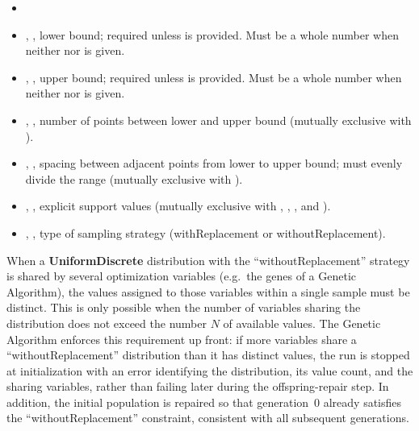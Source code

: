 %
\attrIntro
\vspace{-5mm}
\begin{itemize}
  \itemsep0em
  \item \nameDescription
\end{itemize}
\vspace{-5mm}
\subnodeIntro
\begin{itemize}
  \item {}, , lower bound; required unless
         is provided. Must be a whole number when neither  nor  is given.
  \item {}, , upper bound; required unless
         is provided. Must be a whole number when neither  nor  is given.
  \item {},    , number of points between lower and upper bound (mutually exclusive with ).
  \item {},       , spacing between adjacent points from lower to upper bound; must evenly divide the range (mutually exclusive with ).
  \item {},     , explicit support values (mutually exclusive with , , , and ).
  \item {},   , type of sampling strategy
  (withReplacement or withoutReplacement).
\end{itemize}

\nb When a \textbf{UniformDiscrete} distribution with the ``withoutReplacement'' strategy is shared by several
optimization variables (e.g.\ the genes of a Genetic Algorithm), the values assigned to those variables within a
single sample must be distinct. This is only possible when the number of variables sharing the distribution does not
exceed the number $N$ of available values. The Genetic Algorithm enforces this requirement up front: if more variables
share a ``withoutReplacement'' distribution than it has distinct values, the run is stopped at initialization with an
error identifying the distribution, its value count, and the sharing variables, rather than failing later during the
offspring-repair step. In addition, the initial population is repaired so that generation~0 already satisfies the
``withoutReplacement'' constraint, consistent with all subsequent generations.

